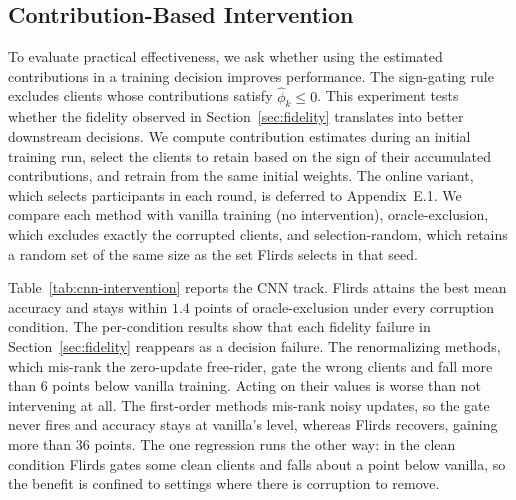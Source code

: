 \documentclass[letterpaper]{article} %
\theoremstyle{definition} %
\begin{document}
\subsection{Contribution-Based Intervention}
\label{sec:intervention}

To evaluate practical effectiveness, we ask whether using the estimated
contributions in a training decision improves performance. The sign-gating
rule excludes clients whose contributions satisfy $\hat\phi_k \le 0$. This
experiment tests whether the fidelity observed in Section~\ref{sec:fidelity}
translates into better downstream decisions. We compute contribution estimates during an initial training run, select the
clients to retain based on the sign of their accumulated contributions, and
retrain from the same initial weights. The online variant, which selects
participants in each round, is deferred to Appendix~E.1. We compare each method with vanilla training (no intervention),
oracle-exclusion, which excludes exactly the corrupted clients, and
selection-random, which retains a random set of the same size as the set
Flirds selects in that seed.

Table~\ref{tab:cnn-intervention} reports the CNN track. Flirds attains the best mean accuracy and stays within $1.4$ points of oracle-exclusion under every corruption condition. The per-condition results show that each fidelity failure in Section~\ref{sec:fidelity} reappears as a decision failure. The renormalizing methods, which mis-rank the zero-update free-rider, gate the wrong clients and fall more than $6$ points below vanilla training. Acting on their values is worse than not intervening at all. The first-order methods mis-rank noisy updates, so the gate never fires and accuracy stays at vanilla's level, whereas Flirds recovers, gaining more than $36$ points. The one regression runs the other way: in the clean condition Flirds gates some clean clients and falls about a point below vanilla, so the benefit is confined to settings where there is corruption to remove.
\end{document}
